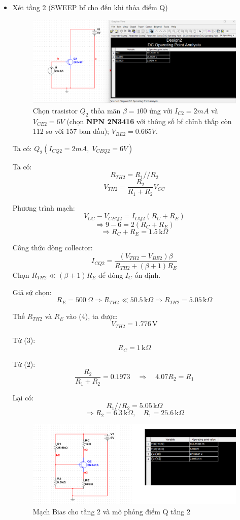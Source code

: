 \begin{itemize}[label=-]
\item Xét tầng 2 (SWEEP bf cho đến khi thỏa điểm Q)

\begin{figure}[H]
	\centering
	\includegraphics[width=.8\linewidth]{./my-chapters/my-images/Question10/a_tang3.png}
	\caption{Chọn trasistor $Q_{2}$ thỏa mãn $\beta = 100$ ứng với $I_{C2} = 2 mA$ và $V_{CE2} = 6V$ (chọn \textbf{NPN 2N3416} với thông số bf chỉnh thấp còn 112 so với 157 ban đầu); $V_{BE2} =0.665V$.}
\end{figure}

\noindent Ta có: $Q_2( I_{CQ2} = 2{mA},\; V_{CEQ2} = 6{V})$

Ta có:
\[
R_{TH2} = R_1 // R_2 \tag{1}
\]
\[
V_{TH2} = \frac{R_2}{R_1 + R_2} V_{CC} \tag{2}
\]

Phương trình mạch:
\[
V_{CC} - V_{CEQ2} = I_{CQ2}(R_C + R_E)
\]
\[
\Rightarrow 9 - 6 = 2(R_C + R_E)
\]
\[
\Rightarrow R_C + R_E = 1.5\,\text{k}\Omega \tag{3}
\]

Công thức dòng collector:
\[
I_{CQ2} = \frac{(V_{TH2} - V_{BE2})\beta}{R_{TH2} + (\beta + 1)R_E} \tag{4}
\]
Chọn \( R_{TH2} \ll (\beta + 1)R_E \) để dòng \( I_C \) ổn định.  

Giả sử chọn:
\[
R_E = 500\,\Omega \Rightarrow R_{TH2} \ll 50.5\,\text{k}\Omega \Rightarrow R_{TH2} = 5.05\,\text{k}\Omega
\]

Thế \( R_{TH2} \) và \( R_E \) vào (4), ta được:
\[
V_{TH2} = 1.776\,\text{V}
\]

Từ (3):
\[
R_C = 1\,\text{k}\Omega
\]

Từ (2):
\[
\frac{R_2}{R_1 + R_2} = 0.1973 \quad \Rightarrow \quad 4.07R_2 = R_1
\]

Lại có:
\[
R_1 // R_2 = 5.05\,\text{k}\Omega
\]
\[
\Rightarrow R_2 = 6.3\,\text{k}\Omega,\quad R_1 = 25.6\,\text{k}\Omega
\]

\begin{figure}[H]
	\centering
	\includegraphics[width=.8\linewidth]{./my-chapters/my-images/Question10/a_tang4.png}
	\caption{Mạch Bias cho tầng 2 và mô phỏng điểm Q tầng 2}
\end{figure}

\end{itemize}


